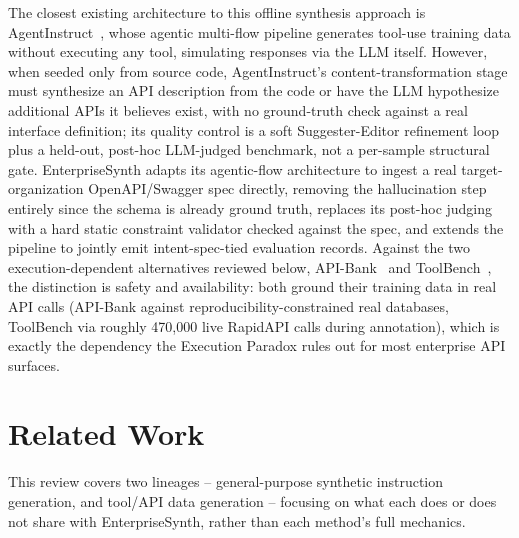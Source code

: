 \documentclass[11pt]{article}
\begin{document}
The closest existing architecture to this offline synthesis approach is
AgentInstruct~\cite{mitra2024agentinstruct}, whose agentic multi-flow pipeline generates tool-use
training data without executing any tool, simulating responses via the LLM itself. However, when
seeded only from source code, AgentInstruct's content-transformation stage must synthesize an API
description from the code or have the LLM hypothesize additional APIs it believes exist, with no
ground-truth check against a real interface definition; its quality control is a soft
Suggester-Editor refinement loop plus a held-out, post-hoc LLM-judged benchmark, not a per-sample
structural gate. EnterpriseSynth adapts its agentic-flow architecture to ingest a real
target-organization OpenAPI/Swagger spec directly, removing the hallucination step entirely since
the schema is already ground truth, replaces its post-hoc judging with a hard static constraint
validator checked against the spec, and extends the pipeline to jointly emit intent-spec-tied
evaluation records. Against the two execution-dependent alternatives reviewed below,
API-Bank~\cite{li2023apibank} and ToolBench~\cite{qin2023toolbench}, the distinction is safety and
availability: both ground their training data in real API calls (API-Bank against
reproducibility-constrained real databases, ToolBench via roughly 470,000 live RapidAPI calls
during annotation), which is exactly the dependency the Execution Paradox rules out for most
enterprise API surfaces.

\section{Related Work}
This review covers two lineages -- general-purpose synthetic instruction generation, and tool/API
data generation -- focusing on what each does or does not share with EnterpriseSynth, rather than
each method's full mechanics.
\end{document}
